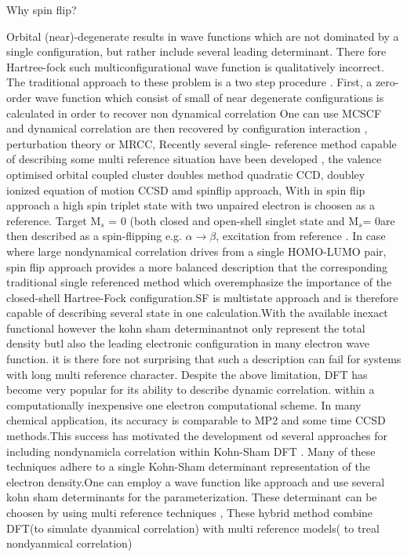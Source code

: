 Why spin flip?

Orbital (near)-degenerate results in wave functions which are not dominated by a single configuration, but rather include several leading determinant. There fore Hartree-fock such multiconfigurational wave function is qualitatively incorrect. The traditional approach to these problem is a two step procedure . First, a zero-order wave function which consist of small of near degenerate configurations is calculated in order to recover non dynamical correlation One can use MCSCF and dynamical correlation are then recovered by configuration interaction , perturbation theory or MRCC, Recently several single- reference  method capable of describing some multi reference situation have been developed , the valence optimised orbital coupled cluster doubles method quadratic  CCD, doubley ionized  equation of motion CCSD amd spinflip approach,  With in spin flip approach  a high spin triplet state with two unpaired electron is choosen as a reference.  Target M\(_{s}\) = 0 (both closed and open-shell singlet state  and M\(_{s}\)= 0are then described as a spin-flipping e.g. \(\alpha \rightarrow \beta\), excitation from reference . In case where large nondynamical correlation drives from a single HOMO-LUMO pair, spin flip approach provides a more balanced description that the corresponding traditional single referenced method which overemphasize the importance of the closed-shell  Hartree-Fock configuration.SF is multistate approach and is therefore capable of describing several state in one calculation.With the available inexact functional however the kohn sham determinantnot only represent the total density butl also the leading electronic configuration in many electron wave function. it is there fore not surprising  that such a description can fail for systems with long multi reference character. Despite the above limitation, DFT has become very popular for its ability to describe dynamic correlation. within a computationally inexpensive one electron computational scheme. In many chemical application, its accuracy is comparable to MP2 and some time CCSD methods.This success has motivated the development od several approaches for including nondynamicla correlation within Kohn-Sham DFT . Many of these techniques adhere to a single Kohn-Sham determinant representation of the electron density.One can employ a wave function like  approach and use several kohn sham determinants for the parameterization. These determinant can be choosen by using multi reference techniques , These hybrid method combine DFT(to simulate dyanmical correlation) with multi reference models( to treal nondyanmical correlation)\\

